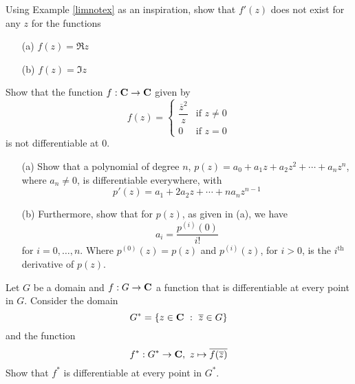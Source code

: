 \vspace{0.1in}

\begin{problem}\label{prob 6.5}
Using Example \ref{limnotex} as an inspiration, show that $f'(z)$ does not exist for any $z$ for the functions
\begin{itemize}
\item[(a)] $f(z) = \Re z$
\item[(b)] $f(z) = \Im z$
\end{itemize}
\end{problem}

\vspace{0.1in}

\begin{problem}\label{prob 6.6}
Show that the function $f : \mathbf C \to \mathbf C$ given by
\[f(z) = \begin{cases} \dfrac{\overline{z}^2}{z} & \text{if }z \neq 0\\[1em] 0 & \text{if } z = 0 \end{cases}\]
is not differentiable at $0$.
\end{problem}

\vspace{0.1in}

\begin{problem}\label{prob 6.7}\hfill
\begin{itemize}
\item[(a)] Show that a polynomial of degree $n$, $p(z) = a_0 + a_1z + a_2z^2 + \cdots + a_nz^n$, where $a_n \neq 0$, is differentiable everywhere, with
\[p'(z) = a_1 + 2a_2z + \cdots + na_nz^{n-1}\]
\item[(b)] Furthermore, show that for $p(z)$, as given in (a), we have
\[a_i = \frac{p^{(i)}(0)}{i!}\]
for $i = 0,\ldots,n$. Where $p^{(0)}(z) = p(z)$ and $p^{(i)}(z)$, for $i>0$, is the $i^{\text{th}}$ derivative of $p(z)$.
\end{itemize}
\end{problem}

\vspace{0.1in}

\begin{problem}\label{prob 6.8}
Let $G$ be a domain and $f: G \to \mathbf C$ a function that is differentiable at every point in $G$. Consider the domain
\[G^* = \left\{z \in \mathbf C\ :\ \overline{z} \in G\right\}\]
and the function 
\[f^*:G^* \to \mathbf C,\ z \mapsto \overline{f(\overline{z})}\]
Show that $f^*$ is differentiable at every point in $G^*$.
\end{problem}


